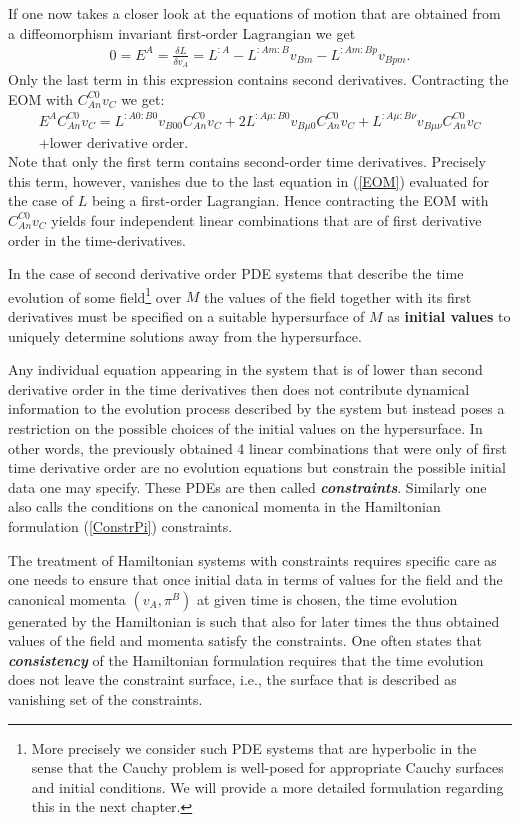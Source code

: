 \documentclass[a4paper,12pt, DIV=14, BCOR=5mm, twoside, headsepline, numbers=noenddot]{scrbook}
\begin{document}
If one now takes a closer look at the equations of motion that are obtained from a diffeomorphism invariant first-order Lagrangian we get
\begin{align}
    0 = E^A = \frac{\delta L}{\delta v_A} = L^{:A} - L^{:Am:B} v_{Bm} - L^{:Am:Bp}v_{Bpm}.
\end{align}
Only the last term in this expression contains second derivatives.
Contracting the EOM with $C_{An}^{C0}v_C$ we get:
\begin{multline}
    E^A C_{An}^{C0}v_C = L^{:A0:B0}v_{B00}C_{An}^{C0}v_C + 2L^{:A\mu : B 0} v_{B\mu 0}C_{An}^{C0}v_C + L^{:A\mu : B \nu} v_{B\mu \nu}C_{An}^{C0}v_C\\
    + \text{lower derivative order}.
\end{multline}
Note that only the first term contains second-order time derivatives. Precisely this term, however, vanishes due to the last equation in (\ref{EOM}) evaluated for the case of $L$ being a first-order Lagrangian. Hence contracting the EOM with $C_{An}^{C0}v_C$ yields four independent linear combinations that are of first derivative order in the time-derivatives.

In the case of second derivative order PDE systems that describe the time evolution of some field\footnote{More precisely we consider such PDE systems that are hyperbolic in the sense that the Cauchy problem is well-posed for appropriate Cauchy surfaces and initial conditions. We will provide a more detailed formulation regarding this in the next chapter.} over $M$ the values of the field together with its first derivatives must be specified on a suitable hypersurface of $M$ as \textbf{\textbf{initial values}} to uniquely determine solutions away from the hypersurface. 


Any individual equation appearing in the system that is of lower than second derivative order in the time derivatives then does not contribute dynamical information to the evolution process described by the system but instead poses a restriction on the possible choices of the initial values on the hypersurface. In other words, the previously obtained 4 linear combinations that were only of first time derivative order are no evolution equations but constrain the possible initial data one may specify. These PDEs are then called \textbf{\textit{constraints}}.
Similarly one also calls the conditions on the canonical momenta in the Hamiltonian formulation (\ref{ConstrPi}) constraints.

The treatment of Hamiltonian systems with constraints requires specific care as one needs to ensure that once initial data in terms of values for the field and the canonical momenta $(v_A,\pi^B)$ at given time is chosen, the time evolution generated by the Hamiltonian is such that also for later times the thus obtained values of the field and momenta satisfy the constraints. One often states that \textbf{\textit{consistency}} of the Hamiltonian formulation requires that the time evolution does not leave the constraint surface, i.e., the surface that is described as vanishing set of the constraints.
\end{document}
